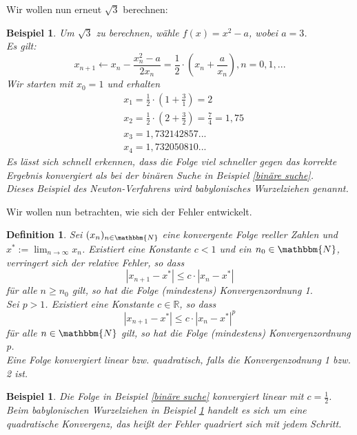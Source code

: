 \documentclass[12pt]{article}
\newcommand{\N}{\mathbbm{N}} %
\newcommand{\R}{\mathbb{R}} %
\newtheorem{definition}[satz]{Definition}
\newtheorem{beispiel}[satz]{Beispiel}
\begin{document}
\noindent Wir wollen nun erneut $\sqrt{3}$ berechnen:

\begin{beispiel}
    Um $\sqrt{3}$ zu berechnen, wähle $f(x)= x^2-a$, wobei $a=3$. \\
    Es gilt: 
    \begin{equation*}
        x_{n+1} \leftarrow x_n - \frac{x_n^2-a}{2x_n}= \frac{1}{2} \cdot \left(x_n+ \frac{a}{x_n}\right), n=0,1,...
    \end{equation*}
    Wir starten mit $x_0=1$ und erhalten
    \begin{align*}
        &x_1= \frac{1}{2} \cdot \left( 1+\frac{3}{1}\right)=2 \\
        &x_2= \frac{1}{2} \cdot \left( 2+ \frac{3}{2} \right)= \frac{7}{4}=1,75 \\
        &x_3= 1,732142857... \\
        &x_4= 1,732050810...
    \end{align*}
    \noindent Es lässt sich schnell erkennen, dass die Folge viel schneller gegen das korrekte Ergebnis konvergiert als bei der binären Suche in Beispiel \ref{binäre suche}. \\
    Dieses Beispiel des Newton-Verfahrens wird babylonisches Wurzelziehen genannt.
    \label{newton verfahren}
\end{beispiel}
\noindent Wir wollen nun betrachten, wie sich der Fehler entwickelt. 

\begin{definition}
    Sei $(x_n)_{n \in \N}$ eine konvergente Folge reeller Zahlen und $x^*:= \lim_{n \to \infty}x_n$. Existiert eine Konstante $c<1$ und ein $n_0 \in \N$, verringert sich der relative Fehler, so dass 
    \begin{equation*}
        |x_{n+1}-x^*| \leq c \cdot |x_n -x^*|
    \end{equation*}
    für alle $n \geq n_0$ gilt, so hat die Folge (mindestens) Konvergenzordnung 1. \\
    Sei $p>1$. Existiert eine Konstante $c \in \R$, so dass
    \begin{equation*}
        |x_{n+1}-x^*| \leq c \cdot |x_n-x^*|^p
    \end{equation*}
    für alle $n \in \N$ gilt, so hat die Folge (mindestens) Konvergenzordnung p. \\
    Eine Folge konvergiert linear bzw. quadratisch, falls die Konvergenzodnung 1 bzw. 2 ist.
\end{definition}

\begin{beispiel}
    Die Folge in Beispiel \ref{binäre suche} konvergiert linear mit $c=\frac{1}{2}$. \\
    Beim babylonischen Wurzelziehen in Beispiel \ref{newton verfahren} handelt es sich um eine quadratische Konvergenz, das heißt der Fehler quadriert sich mit jedem Schritt.
\end{beispiel}
\end{document}
